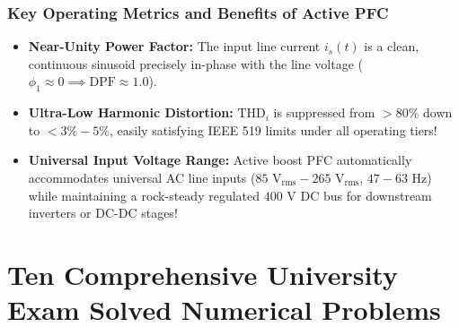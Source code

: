 \documentclass[11pt,a4paper]{article}
\begin{document}
\subsubsection{Key Operating Metrics and Benefits of Active PFC}
\begin{itemize}[leftmargin=*]
  \item \textbf{Near-Unity Power Factor:} The input line current $i_s(t)$ is a clean, continuous sinusoid precisely in-phase with the line voltage ($\phi_1 \approx 0 \implies \text{DPF} \approx 1.0$).
  \item \textbf{Ultra-Low Harmonic Distortion:} $\text{THD}_i$ is suppressed from $>80\%$ down to $<3\% - 5\%$, easily satisfying IEEE 519 limits under all operating tiers!
  \item \textbf{Universal Input Voltage Range:} Active boost PFC automatically accommodates universal AC line inputs ($85\text{ V}_{\text{rms}} - 265\text{ V}_{\text{rms}}$, $47 - 63\text{ Hz}$) while maintaining a rock-steady regulated $400\text{ V}$ DC bus for downstream inverters or DC-DC stages!
\end{itemize}


\section{Ten Comprehensive University Exam Solved Numerical Problems}
\end{document}
